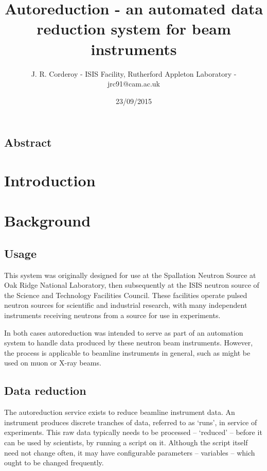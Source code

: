\documentclass[twocolumn]{article}
\title{Autoreduction - an automated data reduction system for beam instruments}
\author{J. R. Corderoy - ISIS Facility, Rutherford Appleton Laboratory -
jrc91@cam.ac.uk}
\date{23/09/2015}
\begin{document}
\maketitle

\subsection*{Abstract}\label{abstract}

\section{Introduction}\label{introduction}

\section{Background}\label{background}

\subsection{Usage}\label{usage}

This system was originally designed for use at the Spallation Neutron
Source at Oak Ridge National Laboratory, then subsequently at the ISIS
neutron source of the Science and Technology Facilities Council. These
facilities operate pulsed neutron sources for scientific and industrial
research, with many independent instruments receiving neutrons from a
source for use in experiments.

In both cases autoreduction was intended to serve as part of an
automation system to handle data produced by these neutron beam
instruments. However, the process is applicable to beamline instruments
in general, such as might be used on muon or X-ray beams.

\subsection{Data reduction}\label{data-reduction}

The autoreduction service exists to reduce beamline instrument data. An
instrument produces discrete tranches of data, referred to as `runs', in
service of experiments. This raw data typically needs to be processed --
`reduced' -- before it can be used by scientists, by running a script on
it. Although the script itself need not change often, it may have
configurable parameters -- variables -- which ought to be changed
frequently.
\end{document}
